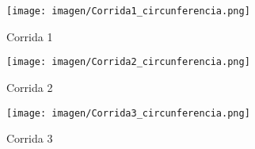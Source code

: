 \begin {figure}[h!]
\centerline{\texttt{[image: imagen/Corrida1\_circunferencia.png]}}
\caption{Corrida 1}
\label{fig}
\end {figure}

\begin {figure}[h!]
\centerline{\texttt{[image: imagen/Corrida2\_circunferencia.png]}}
\caption{Corrida 2}
\label{fig}
\end {figure}

\begin {figure}[h!]
\centerline{\texttt{[image: imagen/Corrida3\_circunferencia.png]}}
\caption{Corrida 3}
\label{fig}
\end {figure}